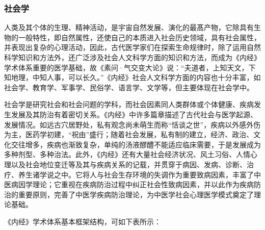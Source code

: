 \documentclass[draft,12pt]{ctexbook}
\begin{document}
\subsubsection{社会学}%

人类及其个体的生理、精神活动，是宇宙自然发展、演化的最髙产物，它除具有生物的一般特性，即自然属性，还使自己的本质进入社会历史领域，具有社会属性，并表现出复杂的心理活动，因此，古代医学家们在探索生命规律时，除了运用自然科学知识和方法外，还广泛涉及社会人文科学方面的知识和方法，而成为《内经》学术体系重要的医学基础，故《素问·气交变大论》说：“夫道者，上知天文，下知地理，中知人事，可以长久。”《内经》社会人文科学方面的内容也十分丰富，如社会学、教育学、军事学、民俗学、语言学、文学等，但主要体现在社会学中。

社会学是研究社会和社会问题的学科，而社会因素同人类群体或个体健康、疾病发生发展及其防治有着密切关系。《内经》中许多篇章描述了古代社会与医学起源、发展情况。如远古穴居野处，私有观念尚未萌生而称“恬谈之世”，疾病以外感外伤为主，医药学初建，“祝由”盛行；随着社会发展，私有制的建立，经济、政治、文化交往增多，疾病也渐致复杂，单纯的汤液醪醴不能适应临床需要，于是发展成为多种剂型、多种治法。此外，《内经》还有大量社会经济状况、风土习俗、人情心理以及社会地位变迁等及其与疾病关系的记载，并贯穿于病因、发病、诊断、治疗、养生诸学说之中。它将人与社会生存环境的失调作为重要致病因素，丰富了中医病因学理论；它重视在疾病防治过程中纠正社会性致病因素，并以此作为疾病防治的重要原则，完善了中医学疾病防治理论，为中医学社会心理医学模式奠定了理论基础。

《内经》学术体系基本框架结构，可如下表所示：

\end{document}
